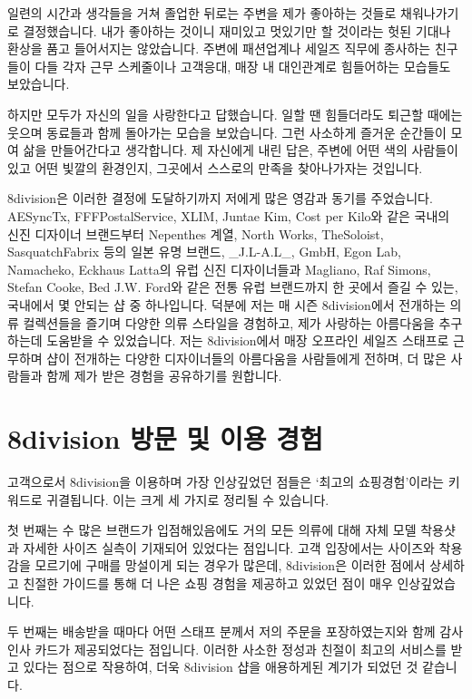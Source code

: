 일련의 시간과 생각들을 거쳐 졸업한 뒤로는 주변을 제가 좋아하는 것들로 채워나가기로 결정했습니다. 내가 좋아하는 것이니 재미있고 멋있기만 할 것이라는 헛된 기대나 환상을 품고 들어서지는 않았습니다. 주변에 패션업계나 세일즈 직무에 종사하는 친구들이 다들 각자 근무 스케줄이나 고객응대, 매장 내 대인관계로 힘들어하는 모습들도 보았습니다.

하지만 모두가 자신의 일을 사랑한다고 답했습니다. 일할 땐 힘들더라도 퇴근할 때에는 웃으며 동료들과 함께 돌아가는 모습을 보았습니다. 그런 사소하게 즐거운 순간들이 모여 삶을 만들어간다고 생각합니다. 제 자신에게 내린 답은, 주변에 어떤 색의 사람들이 있고 어떤 빛깔의 환경인지, 그곳에서 스스로의 만족을 찾아나가자는 것입니다.

8division은 이러한 결정에 도달하기까지 저에게 많은 영감과 동기를 주었습니다. AESyncTx, FFFPostalService, XLIM, Juntae Kim, Cost per Kilo와 같은 국내의 신진 디자이너 브랜드부터 Nepenthes 계열, North Works, TheSoloist, SasquatchFabrix 등의 일본 유명 브랜드, \_J.L-A.L\_, GmbH, Egon Lab, Namacheko, Eckhaus Latta의 유럽 신진 디자이너들과 Magliano, Raf Simons, Stefan Cooke, Bed J.W. Ford와 같은 전통 유럽 브랜드까지 한 곳에서 즐길 수 있는, 국내에서 몇 안되는 샵 중 하나입니다. 덕분에 저는 매 시즌 8division에서 전개하는 의류 컬렉션들을 즐기며 다양한 의류 스타일을 경험하고, 제가 사랑하는 아름다움을 추구하는데 도움받을 수 있었습니다. 저는 8division에서 매장 오프라인 세일즈 스태프로 근무하며 샵이 전개하는 다양한 디자이너들의 아름다움을 사람들에게 전하며, 더 많은 사람들과 함께 제가 받은 경험을 공유하기를 원합니다.

\section*{8division 방문 및 이용 경험}
고객으로서 8division을 이용하며 가장 인상깊었던 점들은 `최고의 쇼핑경험'이라는 키워드로 귀결됩니다. 이는 크게 세 가지로 정리될 수 있습니다.

첫 번째는 수 많은 브랜드가 입점해있음에도 거의 모든 의류에 대해 자체 모델 착용샷과 자세한 사이즈 실측이 기재되어 있었다는 점입니다. 고객 입장에서는 사이즈와 착용감을 모르기에 구매를 망설이게 되는 경우가 많은데, 8division은 이러한 점에서 상세하고 친절한 가이드를 통해 더 나은 쇼핑 경험을 제공하고 있었던 점이 매우 인상깊었습니다.

두 번째는 배송받을 때마다 어떤 스태프 분께서 저의 주문을 포장하였는지와 함께 감사인사 카드가 제공되었다는 점입니다. 이러한 사소한 정성과 친절이 최고의 서비스를 받고 있다는 점으로 작용하여, 더욱 8division 샵을 애용하게된 계기가 되었던 것 같습니다.

